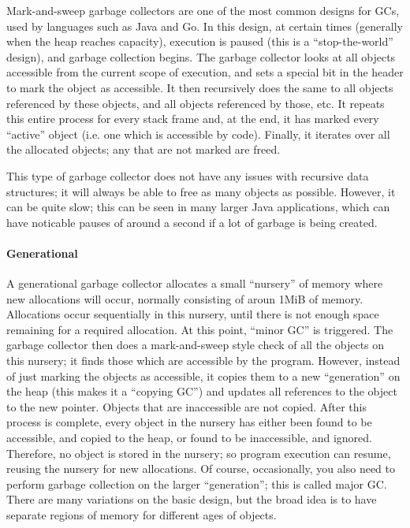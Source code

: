\documentclass[9pt]{extarticle}
\begin{document}
Mark-and-sweep garbage collectors are one of the most common designs for
GCs, used by languages such as Java and Go. In this design, at certain
times (generally when the heap reaches capacity), execution is paused
(this is a ``stop-the-world'' design), and garbage collection begins.
The garbage collector looks at all objects accessible from the current
scope of execution, and sets a special bit in the header to mark the
object as accessible. It then recursively does the same to all objects
referenced by these objects, and all objects referenced by those, etc.
It repeats this entire process for every stack frame and, at the end, it
has marked every ``active'' object (i.e. one which is accessible by
code). Finally, it iterates over all the allocated objects; any that are
not marked are freed.

This type of garbage collector does not have any issues with recursive
data structures; it will always be able to free as many objects as
possible. However, it can be quite slow; this can be seen in many larger
Java applications, which can have noticable pauses of around a second if
a lot of garbage is being created.

\paragraph{Generational}

A generational garbage collector allocates a small ``nursery'' of memory
where new allocations will occur, normally consisting of aroun 1MiB of
memory. Allocations occur sequentially in this nursery, until there is
not enough space remaining for a required allocation. At this point,
``minor GC'' is triggered. The garbage collector then does a
mark-and-sweep style check of all the objects on this nursery; it finds
those which are accessible by the program. However, instead of just
marking the objects as accessible, it copies them to a new
``generation'' on the heap (this makes it a ``copying GC'') and updates
all references to the object to the new pointer. Objects that are
inaccessible are not copied. After this process is complete, every
object in the nursery has either been found to be accessible, and copied
to the heap, or found to be inaccessible, and ignored. Therefore, no
object is stored in the nursery; so program execution can resume,
reusing the nursery for new allocations. Of course, occasionally, you
also need to perform garbage collection on the larger ``generation'';
this is called major GC. There are many variations on the basic design,
but the broad idea is to have separate regions of memory for different
ages of objects.
\end{document}
